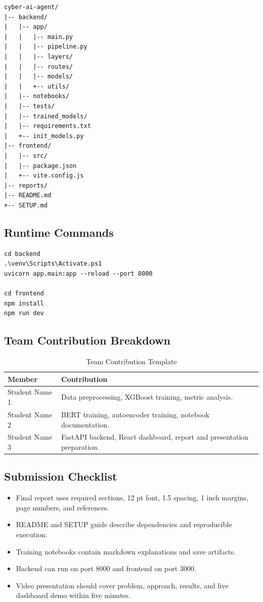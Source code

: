 \documentclass[12pt,a4paper]{article}
\begin{document}
\begin{lstlisting}[caption={Core project structure}]
cyber-ai-agent/
|-- backend/
|   |-- app/
|   |   |-- main.py
|   |   |-- pipeline.py
|   |   |-- layers/
|   |   |-- routes/
|   |   |-- models/
|   |   +-- utils/
|   |-- notebooks/
|   |-- tests/
|   |-- trained_models/
|   |-- requirements.txt
|   +-- init_models.py
|-- frontend/
|   |-- src/
|   |-- package.json
|   +-- vite.config.js
|-- reports/
|-- README.md
+-- SETUP.md
\end{lstlisting}

\subsection{Runtime Commands}

\begin{lstlisting}[caption={Backend and frontend demo commands}]
cd backend
.\venv\Scripts\Activate.ps1
uvicorn app.main:app --reload --port 8000

cd frontend
npm install
npm run dev
\end{lstlisting}

\subsection{Team Contribution Breakdown}

\begin{table}[H]
\centering
\caption{Team Contribution Template}
\begin{tabularx}{\linewidth}{l X}
\toprule
Member & Contribution \\
\midrule
Student Name 1 & Data preprocessing, XGBoost training, metric analysis. \\
Student Name 2 & BERT training, autoencoder training, notebook documentation. \\
Student Name 3 & FastAPI backend, React dashboard, report and presentation preparation. \\
\bottomrule
\end{tabularx}
\end{table}

\subsection{Submission Checklist}

\begin{itemize}[leftmargin=1.2cm]
    \item Final report uses required sections, 12 pt font, 1.5 spacing, 1 inch margins, page numbers, and references.
    \item README and SETUP guide describe dependencies and reproducible execution.
    \item Training notebooks contain markdown explanations and save artifacts.
    \item Backend can run on port 8000 and frontend on port 3000.
    \item Video presentation should cover problem, approach, results, and live dashboard demo within five minutes.
\end{itemize}
\end{document}
